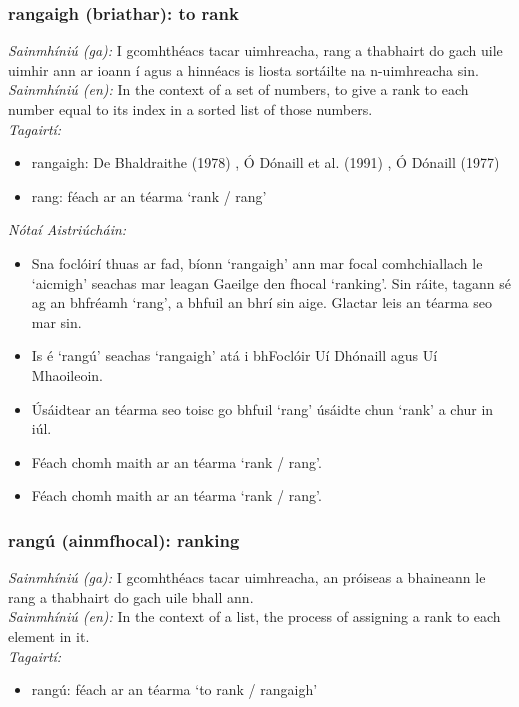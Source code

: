 \subsubsection*{rangaigh (briathar): to rank}
 \noindent \textit{Sainmhíniú (ga):} I gcomhthéacs tacar uimhreacha, rang a thabhairt do gach uile uimhir ann ar ioann í agus a hinnéacs is liosta sortáilte na n-uimhreacha sin.
\\
 \noindent \textit{Sainmhíniú (en):} In the context of a set of numbers, to give a rank to each number equal to its index in a sorted list of those numbers.
\\
 \noindent \textit{Tagairtí:}
\begin{itemize}
	\item rangaigh: De Bhaldraithe (1978) \cite{de-bhaldraithe}, Ó Dónaill et al. (1991) \cite{focloir-beag}, Ó Dónaill (1977) \cite{odonaill}
	\item rang: féach ar an téarma `rank / rang'
\end{itemize}

 \noindent \textit{Nótaí Aistriúcháin:}
\begin{itemize}
	\item Sna foclóirí thuas ar fad, bíonn `rangaigh' ann mar focal comhchiallach le `aicmigh' seachas mar leagan Gaeilge den fhocal `ranking'. Sin ráite, tagann sé ag an bhfréamh `rang', a bhfuil an bhrí sin aige. Glactar leis an téarma seo mar sin.
	\item Is é `rangú' seachas `rangaigh' atá i bhFoclóir Uí Dhónaill agus Uí Mhaoileoin.
	\item Úsáidtear an téarma seo toisc go bhfuil `rang' úsáidte chun `rank' a chur in iúl.
	\item Féach chomh maith ar an téarma `rank / rang'.
	\item Féach chomh maith ar an téarma `rank / rang'.
\end{itemize}


\subsubsection*{rangú (ainmfhocal): ranking}
 \noindent \textit{Sainmhíniú (ga):} I gcomhthéacs tacar uimhreacha, an próiseas a bhaineann le rang a thabhairt do gach uile bhall ann.
\\
 \noindent \textit{Sainmhíniú (en):} In the context of a list, the process of assigning a rank to each element in it.
\\
 \noindent \textit{Tagairtí:}
\begin{itemize}
	\item rangú: féach ar an téarma `to rank / rangaigh'
\end{itemize}

